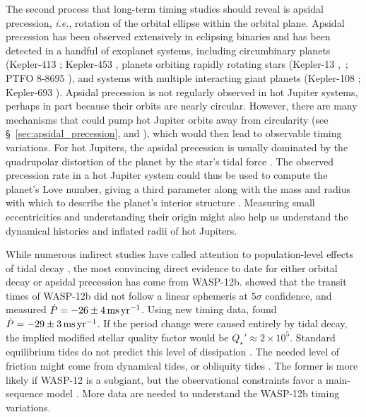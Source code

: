 \documentclass[12pt,twocolumn,tighten]{aastex62}
\begin{document}
The second process that long-term timing studies should reveal is
apsidal precession, {\it i.e.}, rotation of the orbital ellipse within
the orbital plane. Apsidal precession has been observed extensively in
eclipsing binaries \citep[{\it e.g.},][]{
  schwarzschild_structure_1958,torres_accurate_2010,borkovits_eclipse_2015}
and has been detected in a handful of exoplanet systems, including
circumbinary planets (Kepler-413 \citealt{kostov_kepler-413b_2014};
Kepler-453 \citealt{welsh_kepler_2015}, planets orbiting rapidly
rotating stars (Kepler-13
\citealt{szabo_spin-orbit_2012,szabo_mapping_2014},~\citealt{masuda_spin-orbit_2015};
PTFO 8-8695 \citealt{barnes_measurement_2013}), and systems with
multiple interacting giant planets (Kepler-108
\citealt{mills_kepler-108_2017}; Kepler-693
\citealt{masuda_eccentric_2017}).  Apsidal precession is not regularly
observed in hot Jupiter systems, perhaps in part because their orbits
are nearly circular.  However, there are many mechanisms that
could pump hot Jupiter orbits away from circularity (see
\S~\ref{sec:apsidal_precession}, and
\citealt{bailey_understanding_2019}), which would then lead to
observable timing variations.  For hot Jupiters, the apsidal
precession is usually dominated by the quadrupolar distortion of the
planet by the star's tidal force \citep{ragozzine_probing_2009}.  The
observed precession rate in a hot Jupiter system could thus be used to
compute the planet's Love number, giving a third parameter along with
the mass and radius with which to describe the planet's interior
structure \citep[{\it e.g.},][who performed a similar procedure for
HAT-P-13b]{batygin_determination_2009}.  Measuring small
eccentricities and understanding their origin might also help us
understand the dynamical histories and inflated radii of hot Jupiters.
\citep[{\it
e.g.},][respectively]{dawson_origins_2018,ibgui_tidal_2010}

While numerous indirect studies have called attention to
population-level effects of tidal decay
\citep{jackson_observational_2009,hansen_calibration_2010,penev_constraining_2012,husnoo_observational_2012,matsakos_origin_2016,cameron_hierarchical_2018,penev_empirical_2018},
the most convincing direct evidence to date for either orbital decay
or apsidal precession has come from WASP-12b.
\citet{maciejewski_departure_2016} showed that the transit times of
WASP-12b did not follow a linear ephemeris at $5\sigma$ confidence,
and measured $\dot{P} = -26 \pm 4\,{\rm ms}\,{\rm yr}^{-1}$.  Using
new timing data, \citet{patra_2017} found $\dot{P} = -29 \pm 3\,{\rm
ms}\,{\rm yr}^{-1}$.  If the period change were caused entirely by
tidal decay, the implied modified stellar quality factor would be
$Q_\star' \approx 2\times10^5$.  Standard equilibrium tides do not
predict this level of dissipation
\citep{penev_tidal_2011,ogilvie_tidal_2014}.  The needed level of
friction might come from dynamical tides, or obliquity tides
\citep{weinberg_tidal_2017,millholland_obliquity_2018}.  The former is
more likely if WASP-12 is a subgiant, but the observational
constraints favor a main-sequence model
\citep{bailey_understanding_2019}.  More data are needed to understand
the WASP-12b timing variations.
\end{document}
